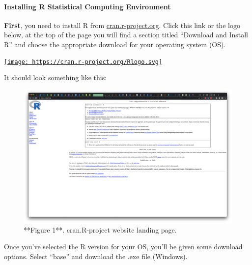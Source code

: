 \documentclass[
]{article}
\begin{document}
\hypertarget{installing-r-statistical-computing-environment}{%
\paragraph{Installing R Statistical Computing
Environment}\label{installing-r-statistical-computing-environment}}

\hfill\break

\textbf{First}, you need to install R from
\href{https://cran.r-project.org/}{cran.r-project.org}. Click this link
or the logo below, at the top of the page you will find a section titled
``Download and Install R'' and choose the appropriate download for your
operating system (OS).

\href{https://cran.r-project.org/}{\texttt{[image: https://cran.r-project.org/Rlogo.svg]}}

It should look something like this:

\begin{figure}

{\centering \includegraphics{images/cran_page} 

}

\caption{**Figure 1**. cran.R-project website landing page.}\label{fig:screenshot of R main site}
\end{figure}

Once you've selected the R version for your OS, you'll be given some
download options. Select ``base'' and download the .exe file (Windows).
\end{document}
